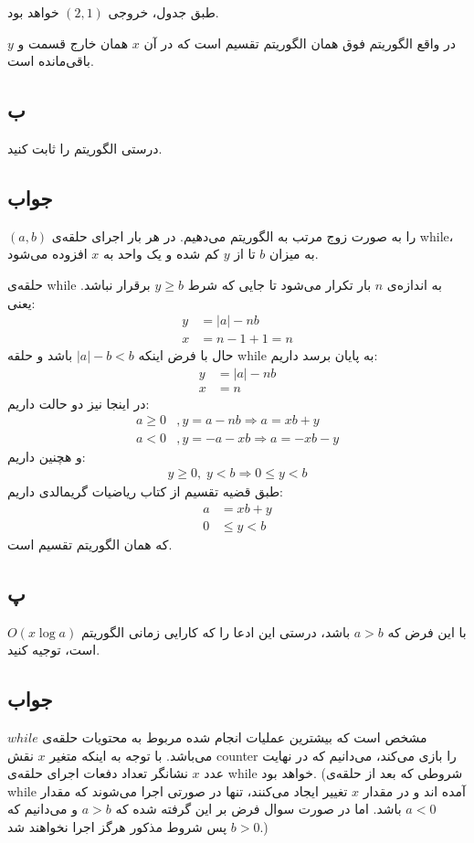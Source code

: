 \documentclass[]{article}
\begin{document}
طبق جدول، خروجی 
$(2, 1)$
خواهد بود.

در واقع الگوریتم فوق همان الگوریتم تقسیم است که در آن
$x$ 
همان خارج قسمت و 
$y$
باقی‌مانده است.
\pagebreak
\subsection{ب}
درستی الگوریتم را ثابت کنید.

\subsection*{جواب}
$(a, b)$
را به صورت زوج مرتب به الگوریتم می‌دهیم.
در هر بار اجرای حلقه‌ی while،
به میزان
$b$
تا از 
$y$
کم شده و یک واحد به 
$x$
افزوده می‌شود.

حلقه‌ی while
به اندازه‌ی $n$
بار تکرار می‌شود تا جایی که شرط
$y \geq b$
برقرار نباشد. یعنی:
\begin{align*}
y &= |a| - nb\\
x &= n - 1 + 1 = n
\end{align*} 
حال با فرض اینکه 
$|a| - b < b$
باشد و حلقه while
به پایان برسد داریم:
\begin{align*}
    y &= |a| - nb \\
    x &= n
\end{align*}
در اینجا نیز دو حالت داریم:
\begin{align*}
    a \geq 0&, y = a - nb \Rightarrow a = xb + y \\
    a < 0&, y = - a - xb \Rightarrow a = -xb - y
\end{align*}
و هچنین داریم:
\begin{align*}
    y \geq 0,\; y < b \Rightarrow 0 \leq y < b
\end{align*} 
طبق قضیه تقسیم از کتاب ریاضیات گریمالدی داریم:
\begin{align*}
a &= xb + y \\
0 &\leq y < b
\end{align*}
که همان الگوریتم تقسیم است.

\pagebreak
\subsection{پ}
با این فرض که
$a > b$
باشد، درستی این ادعا را که کارایی زمانی الگوریتم
$O(x\log{a})$
است، توجیه کنید.
\subsection*{جواب}
مشخص است که بیشترین عملیات انجام شده مربوط به محتویات حلقه‌ی
$while$
می‌باشد.
با توجه به اینکه متغیر
$x$
نقش counter
را بازی می‌کند، می‌دانیم که در نهایت عدد
$x$
نشانگر تعداد دفعات اجرای حلقه‌ی 
while
خواهد بود.
(شروطی که بعد از حلقه‌ی
while
آمده اند و در مقدار 
$x$
تغییر ایجاد می‌کنند، تنها در صورتی اجرا می‌شوند که مقدار
$a < 0$
باشد. اما در صورت سوال فرض بر این گرفته شده که 
$a>b$
و می‌دانیم که 
$b>0$
پس شروط مذکور هرگز اجرا نخواهند شد.)
\end{document}
